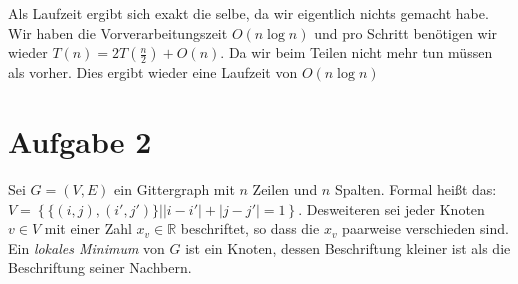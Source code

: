 \documentclass[11pt,a4paper,ngerman]{article}
\begin{document}
Als Laufzeit ergibt sich exakt die selbe, da wir eigentlich nichts gemacht habe. Wir haben die Vorverarbeitungszeit $O(n \log n)$ und pro Schritt benötigen wir wieder $T(n) = 2 T(\frac{n}{2}) + O(n)$. Da wir beim Teilen nicht mehr tun müssen als vorher. Dies ergibt wieder eine Laufzeit von $O(n \log n)$

\pagebreak
\section*{Aufgabe 2}

Sei $G = \left( V, E \right)$ ein Gittergraph mit $n$ Zeilen und $n$ Spalten. Formal heißt das:\\
$V = \left\{ \{ (i,j), (i' , j') \} | \left| i - i' \right| + \left| j - j' \right| = 1 \right\}$. Desweiteren sei jeder Knoten $v \in V$ mit einer Zahl $x_v \in \mathbb{R}$ beschriftet, so dass die $x_v$ paarweise verschieden sind. Ein \emph{lokales Minimum} von $G$ ist ein Knoten, dessen Beschriftung kleiner ist als die Beschriftung seiner Nachbern.
\end{document}
